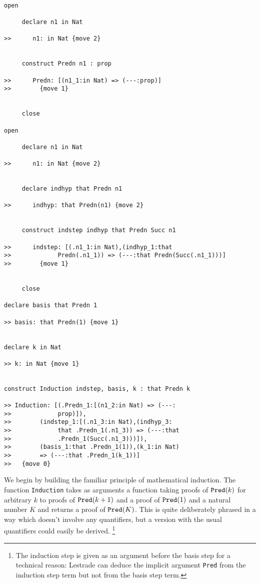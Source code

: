 \documentclass[12pt]{article}
\begin{document}
\begin{verbatim}

open

     declare n1 in Nat

>>      n1: in Nat {move 2}


     construct Predn n1 : prop

>>      Predn: [(n1_1:in Nat) => (---:prop)]
>>        {move 1}


     close

open

     declare n1 in Nat

>>      n1: in Nat {move 2}


     declare indhyp that Predn n1

>>      indhyp: that Predn(n1) {move 2}


     construct indstep indhyp that Predn Succ n1

>>      indstep: [(.n1_1:in Nat),(indhyp_1:that 
>>             Predn(.n1_1)) => (---:that Predn(Succ(.n1_1)))]
>>        {move 1}


     close

declare basis that Predn 1

>> basis: that Predn(1) {move 1}


declare k in Nat

>> k: in Nat {move 1}


construct Induction indstep, basis, k : that Predn k

>> Induction: [(.Predn_1:[(n1_2:in Nat) => (---:
>>             prop)]),
>>        (indstep_1:[(.n1_3:in Nat),(indhyp_3:
>>             that .Predn_1(.n1_3)) => (---:that 
>>             .Predn_1(Succ(.n1_3)))]),
>>        (basis_1:that .Predn_1(1)),(k_1:in Nat) 
>>        => (---:that .Predn_1(k_1))]
>>   {move 0}

\end{verbatim}

We begin by building the familiar principle of mathematical induction.  The function {\tt Induction} takes as arguments a function taking proofs
of ${\tt Pred}(k)$ for arbitrary $k$ to proofs of ${\tt Pred}(k+1)$ and a proof of ${\tt Pred}(1)$ and a natural number $K$ and returns a proof
of ${\tt Pred}(K)$.  This is quite deliberately phrased in a way which doesn't involve any quantifiers, but a version with the usual quantifiers could easily be derived.  \footnote{The induction step is given as an argument before the basis step for a technical reason:  Lestrade can deduce the implicit argument {\tt Pred} from the induction step term but not from the basis step term.}
\end{document}
